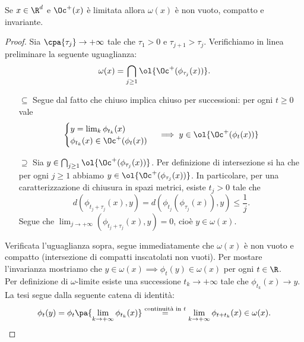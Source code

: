 \begin{proposition}\label{OrbitaPositivaLimitataImplicaCompattezzaEInvarianzaOmegaLimite}
Se $x\in\R^d$ e $\Oc^+(x)$ \`e limitata allora $\omega(x)$ \`e non vuoto, compatto e invariante.
\end{proposition}
\begin{proof}
Sia $\cpa{\tau_j}\to+\infty$ tale che $\tau_1>0$ e $\tau_{j+1}>\tau_j$. 
Verifichiamo in linea preliminare la seguente uguaglianza:
\[\omega(x)=\bigcap_{j\geq 1}\ol{\Oc^+(\phi_{\tau_j}(x))}.\]
\setlength{\leftmargini}{0cm}  
\begin{itemize}
\item[$\boxed{\subseteq}$] Segue dal fatto che chiuso implica chiuso per successioni: per ogni $t\geq 0$ vale
\[\begin{cases}
y=\lim_k\phi_{t_k}(x)\\
\phi_{t_k}(x)\in \Oc^+(\phi_t(x))
\end{cases}\implies y\in \ol{\Oc^+(\phi_t(x))}\]
\item[$\boxed{\supseteq}$] Sia $y\in \bigcap_{j\geq 1}\ol{\Oc^+(\phi_{\tau_j}(x))}$. Per definizione di intersezione si ha che per ogni $j\geq 1$ abbiamo $y\in\ol{\Oc^+(\phi_{\tau_j}(x))}$. In particolare, per una caratterizzazione di chiusura in spazi metrici, esiste $t_j>0$ tale che
\[d(\phi_{t_j+\tau_j}(x),y)=d(\phi_{t_j}(\phi_{\tau_j}(x)),y)\leq \frac1j.\]
Segue che $\displaystyle\lim_{j\to+\infty}(\phi_{t_j+\tau_j}(x),y)=0$, cio\`e $y\in \omega(x)$.
\end{itemize}
Verificata l'uguaglianza sopra, segue immediatamente che $\omega(x)$ \`e non vuoto e compatto (intersezione di compatti inscatolati non vuoti). Per mostare l'invarianza mostriamo che $y\in\omega(x)\implies \phi_t(y)\in\omega(x)$ per ogni $t\in\R$.\\
Per definizione di $\omega$-limite esiste una successione $t_k\to+\infty$ tale che $\phi_{t_k}(x)\to y$. La tesi segue dalla seguente catena di identit\`a:
\[\phi_t(y)=\phi_t\pa{\lim_{k\to+\infty}\phi_{t_k}(x)}\overset{\text{continuit\`a in $t$}}=\lim_{k\to+\infty}\phi_{t+t_k}(x)\in\omega(x).\]
\end{proof}

